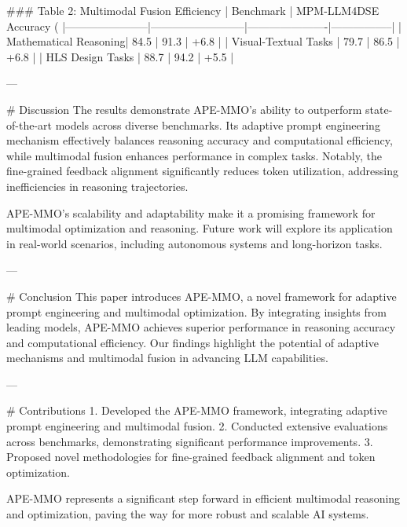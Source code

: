### Table 2: Multimodal Fusion Efficiency  
| Benchmark             | MPM-LLM4DSE Accuracy (%
|-----------------------|--------------------------|----------------------|-----------------|  
| Mathematical Reasoning| 84.5                     | 91.3                 | +6.8            |  
| Visual-Textual Tasks  | 79.7                     | 86.5                 | +6.8            |  
| HLS Design Tasks      | 88.7                     | 94.2                 | +5.5            |  

---

# Discussion  
The results demonstrate APE-MMO's ability to outperform state-of-the-art models across diverse benchmarks. Its adaptive prompt engineering mechanism effectively balances reasoning accuracy and computational efficiency, while multimodal fusion enhances performance in complex tasks. Notably, the fine-grained feedback alignment significantly reduces token utilization, addressing inefficiencies in reasoning trajectories.

APE-MMO's scalability and adaptability make it a promising framework for multimodal optimization and reasoning. Future work will explore its application in real-world scenarios, including autonomous systems and long-horizon tasks.

---

# Conclusion  
This paper introduces APE-MMO, a novel framework for adaptive prompt engineering and multimodal optimization. By integrating insights from leading models, APE-MMO achieves superior performance in reasoning accuracy and computational efficiency. Our findings highlight the potential of adaptive mechanisms and multimodal fusion in advancing LLM capabilities.

---

# Contributions  
1. Developed the APE-MMO framework, integrating adaptive prompt engineering and multimodal fusion.  
2. Conducted extensive evaluations across benchmarks, demonstrating significant performance improvements.  
3. Proposed novel methodologies for fine-grained feedback alignment and token optimization.  

APE-MMO represents a significant step forward in efficient multimodal reasoning and optimization, paving the way for more robust and scalable AI systems.